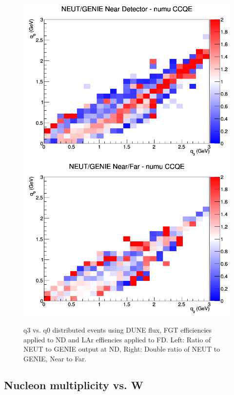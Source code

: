 \documentclass[12pt]{article}
\begin{document}
\begin{figure}[h]
\includegraphics[width=\linewidth]{eff_q0_q3/FGT/ratios/CCQE_NEUT_GENIE_numu_near_q3_q0.png}
\endminipage
{}
\includegraphics[width=\linewidth]{eff_q0_q3/FGT/ratios/CCQE_NEUT_GENIE_numu_NF_q3_q0.png}
\endminipage
\caption{q3 vs. q0 distributed events using DUNE flux, FGT efficiencies applied to ND and LAr effiencies applied to FD. Left: Ratio of NEUT to GENIE output at ND, Right: Double ratio of NEUT to GENIE, Near to Far.}
\end{figure}
\FloatBarrier

\subsection{Nucleon multiplicity vs. W}
\end{document}
